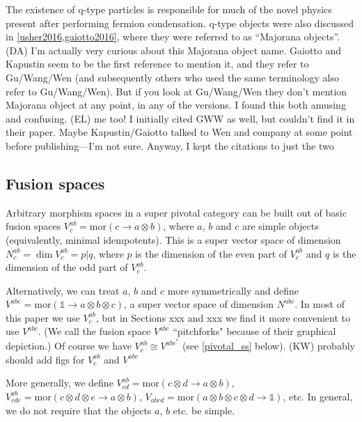 \documentclass[12pt,a4paper]{article}
\newcommand{\tp}{\otimes}
\newcommand{\unit}{\mathds{1}}
\newcommand{\mor}{\text{mor}}
\newcommand{\kw}[1]{{\color{kwcolor}\footnotesize{(KW) #1}}}
\newcommand{\dave}[1]{{\color{ao(english)}\footnotesize{(DA) #1}}}
\newcommand{\ethan}[1]{{\color{amethyst}\footnotesize{(EL) #1}}}
\begin{document}
The existence of q-type particles is responsible for much of the novel physics present after performing fermion condensation. 
q-type objects were also discussed in \ref{usher2016,gaiotto2016}, where they were referred to as ``Majorana objects''. 
\dave{I'm actually very curious about this Majorana object name. 
Gaiotto and Kapustin seem to be the first reference to mention it, 
and they refer to Gu/Wang/Wen (and subsequently others who used the same terminology also refer to Gu/Wang/Wen). 
But if you look at Gu/Wang/Wen they don't mention Majorana object at any point, 
in any of the versions. 
I found this both amusing and confusing.
}
\ethan{me too! I initially cited GWW as well, but couldn't find it in their paper. Maybe Kapustin/Gaiotto talked to Wen and company at some point before publishing---I'm not sure. Anyway, I kept the citations to just the two}


\subsection{Fusion spaces} \label{fusion_spaces}

Arbitrary morphism spaces in a super pivotal category can be built out of basic fusion spaces
$V^{ab}_c = \mor(c\to a\tp b)$,
where $a$, $b$ and $c$ are simple objects (equivalently, minimal idempotents).
This is a super vector space of dimension
$N^{ab}_c = \dim V^{ab}_c = p|q$, where $p$ is the dimension of the even part
of $V^{ab}_c$ and $q$ is the dimension of the odd part of $V^{ab}_c$.

Alternatively, we can treat $a$, $b$ and $c$ more symmetrically and define
$V^{abc} = \mor(\unit\to a\tp b\tp c)$, a super vector space of dimension $N^{abc}$.
In most of this paper we use $V^{ab}_c$, but in Sections xxx and xxx we find it more convenient
to use $V^{abc}$.
(We call the fusion space $V^{abc}$ ``pitchforks" because of their graphical depiction.)
Of course we have $V^{ab}_c \cong V^{abc^*}$ (see \ref{pivotal_ss} below).
\kw{probably should add figs for $V^{ab}_c$ and $V^{abc}$}

More generally, we define $V^{ab}_{cd} = \mor(c\tp d\to a\tp b)$, $V^{ab}_{cde} = \mor(c\tp d\tp e\to a\tp b)$,
$V_{abcd} = \mor(a\tp b\tp c\tp d\to \unit)$, etc.
In general, we do not require that the objects $a$, $b$ etc. be simple.
\end{document}
